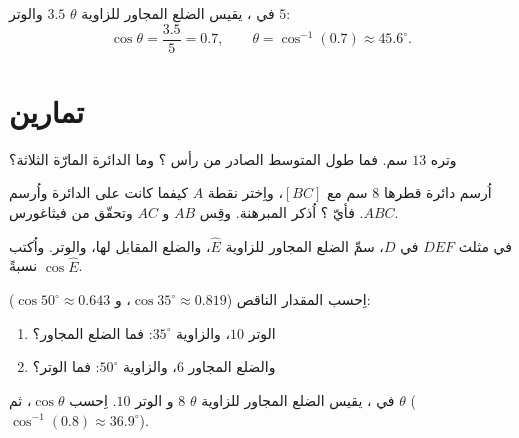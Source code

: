 \begin{example}\label{ex:g8:cosine:angle}
في ، يقيس الضلع المجاور للزاوية $\theta$
$3.5$ والوتر $5$:
\[
\cos\theta = \frac{3.5}{5} = 0.7,
\qquad
\theta = \cos^{-1}(0.7) \approx 45.6^\circ .
\]
\end{example}

\section{تمارين}

\begin{exercise}[$\star$]\label{exo:g8:cosine:1}
 وتره $13$ سم. فما طول
المتوسط الصادر من رأس ؟ وما 
الدائرة المارّة  الثلاثة؟
\end{exercise}

\begin{exercise}[$\star$]\label{exo:g8:cosine:2}
اُرسم دائرة قطرها $8$ سم مع  $[BC]$، واِختر نقطة
$A$ كيفما كانت على الدائرة واُرسم $ABC$. فأيّ ؟ اُذكر
المبرهنة. وقِس $AB$ و $AC$ وتحقّق من فيثاغورس.
\end{exercise}

\begin{exercise}[$\star$]\label{exo:g8:cosine:3}
في مثلث $DEF$  في $D$، سمِّ الضلع المجاور
للزاوية $\widehat E$، والضلع المقابل لها، والوتر.
واُكتب $\cos \widehat E$ نسبةً.
\end{exercise}

\begin{exercise}[$\star$]\label{exo:g8:cosine:4}
اِحسب المقدار الناقص ($\cos 35^\circ \approx 0.819$،
و $\cos 50^\circ \approx 0.643$):
\begin{enumerate}
  \item الوتر $10$، والزاوية $35^\circ$: فما الضلع المجاور؟
  \item والضلع المجاور $6$، والزاوية $50^\circ$: فما الوتر؟
\end{enumerate}
\end{exercise}

\begin{exercise}[$\star$]\label{exo:g8:cosine:5}
في ، يقيس الضلع المجاور للزاوية $\theta$ $8$ و
الوتر $10$. اِحسب $\cos\theta$، ثم $\theta$
($\cos^{-1}(0.8) \approx 36.9^\circ$).
\end{exercise}

